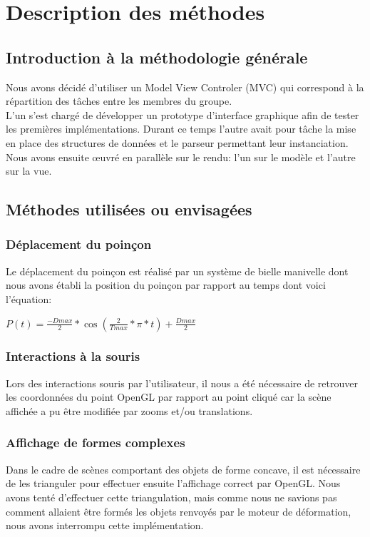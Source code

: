 \documentclass[a4paper, 11pt]{article}
\begin{document}
\section{Description des méthodes}
\subsection{Introduction à la méthodologie générale}
Nous avons décidé d'utiliser un Model View Controler (MVC) qui correspond à la répartition des tâches entre les membres du groupe.\\
L'un s'est chargé de développer un prototype d'interface graphique afin de tester les premières implémentations.
Durant ce temps l'autre avait pour tâche la mise en place des structures de données et le parseur permettant leur instanciation.\\
Nous avons ensuite œuvré en parallèle sur le rendu: l'un sur le modèle et l'autre sur la vue.

\subsection{Méthodes utilisées ou envisagées}
\subsubsection{Déplacement du poinçon}
Le déplacement du poinçon est réalisé par un système de bielle manivelle dont nous avons établi la position du poinçon par rapport au temps dont voici l'équation:\\
\begin{center}
    $P(t) = \frac{-Dmax}{2}*\cos(\frac{2}{Tmax}*\pi*t)+\frac{Dmax}{2}$
\end{center}

\subsubsection{Interactions à la souris}
Lors des interactions souris par l'utilisateur, il nous a été nécessaire de retrouver les coordonnées du point OpenGL par rapport au point cliqué car la scène affichée a pu être modifiée par zooms et/ou translations.

\subsubsection{Affichage de formes complexes}
Dans le cadre de scènes comportant des objets de forme concave, il est nécessaire de les trianguler pour effectuer ensuite l'affichage correct par OpenGL.
Nous avons tenté d'effectuer cette triangulation, mais comme nous ne savions pas comment allaient être formés les objets renvoyés par le moteur de déformation, nous avons interrompu cette implémentation.
\end{document}
